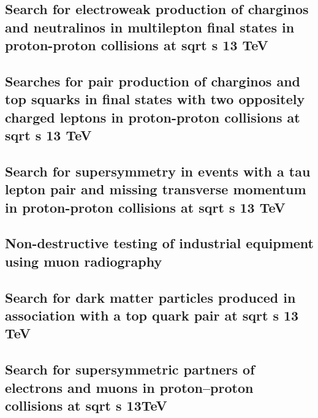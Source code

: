 \documentclass[a4paper, 11pt, twoside, openright]{report}
\begin{document}
\subsection{Search for electroweak production of charginos and neutralinos in multilepton final states in proton-proton collisions at sqrt s 13 TeV}


\subsection{Searches for pair production of charginos and top squarks in final states with two oppositely charged leptons in proton-proton collisions at sqrt s 13 TeV}


\subsection{Search for supersymmetry in events with a tau lepton pair and missing transverse momentum in proton-proton collisions at sqrt s 13 TeV}


\subsection{Non-destructive testing of industrial equipment using muon radiography}


\subsection{Search for dark matter particles produced in association with a top quark pair at sqrt s 13 TeV}


\subsection{Search for supersymmetric partners of electrons and muons in proton–proton collisions at sqrt s 13TeV}

\end{document}
